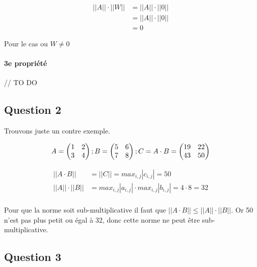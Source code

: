 \begin{equation}
	\begin{aligned}
		||A|| \cdot ||W|| &= ||A|| \cdot ||0||\\
		&= ||A|| \cdot ||0||\\
		&= 0
	\end{aligned}
\end{equation}

Pour le cas ou $W \neq 0$ 

\paragraph{3e propriété}

// TO DO

\subsection{Question 2}

Trouvons juste un contre exemple.

\begin{equation}
	A = 
	\begin{pmatrix}
		1 & 2\\
		3 & 4
	\end{pmatrix};\\
	B = 
	\begin{pmatrix}
		5 & 6\\
		7 & 8
	\end{pmatrix};\\
	C = A \cdot B = 
	\begin{pmatrix}
		19 & 22\\
		43 & 50
	\end{pmatrix}
\end{equation}

\begin{equation}
	\begin{aligned}
		||A \cdot B|| &= ||C|| = max_{i,j}|c_{i,j}| = 50\\
		||A|| \cdot ||B|| &= max_{i,j}|a_{i,j}| \cdot max_{i,j}|b_{i,j}| = 4 \cdot 8 = 32\\
	\end{aligned}
\end{equation}

Pour que la norme soit sub-multiplicative il faut que $||A \cdot B|| \leq ||A|| \cdot ||B||$. Or 50 n'est pas plus petit ou égal à 32, donc cette norme ne peut être sub-multiplicative.

\subsection{Question 3}

